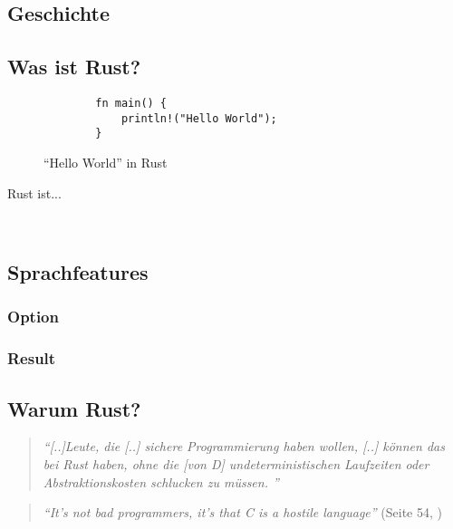 
\subsection{Geschichte}

\subsection{Was ist Rust?}

\begin{wrapfigure}{r}{.5\textwidth}
	\begin{verbatim}
		fn main() {
		    println!("Hello World");
		}
	\end{verbatim}
	\caption{\enquote{Hello World} in Rust}
	\label{fig:rust:hello_world}
\end{wrapfigure}

Rust ist...

 \\

\FloatBarrier
\subsection{Sprachfeatures}
\subsubsection{Option}
\subsubsection{Result}

\subsection{Warum Rust?}

\begin{quotation}
	\textit{\enquote{[..]Leute, die [..] sichere Programmierung haben wollen, [..] können das bei Rust haben, ohne die [von D] undeterministischen Laufzeiten oder Abstraktionskosten schlucken zu müssen. }}
	\cite{rust:fefe}
\end{quotation}




\begin{quotation}
	\textit{\enquote{It’s not bad programmers, it’s that C is a hostile language}} 
	(Seite 54, \cite{rust:c_is_hostile_mena})
\end{quotation}

